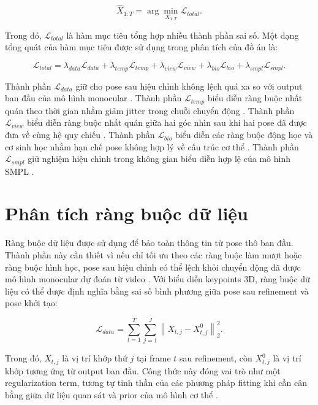 \documentclass[../DoAn.tex]{subfiles}
\begin{document}
\begin{equation}
\hat{X}_{1:T}
=
\arg\min_{X_{1:T}}
\mathcal{L}_{total}.
\end{equation}

Trong đó, $\mathcal{L}_{total}$ là hàm mục tiêu tổng hợp nhiều thành phần sai số. Một dạng tổng quát của hàm mục tiêu được sử dụng trong phân tích của đồ án là:

\begin{equation}
\mathcal{L}_{total}
=
\lambda_{data}\mathcal{L}_{data}
+
\lambda_{temp}\mathcal{L}_{temp}
+
\lambda_{view}\mathcal{L}_{view}
+
\lambda_{bio}\mathcal{L}_{bio}
+
\lambda_{smpl}\mathcal{L}_{smpl}.
\end{equation}

Thành phần $\mathcal{L}_{data}$ giữ cho pose sau hiệu chỉnh không lệch quá xa so với output ban đầu của mô hình monocular \cite{smplify2016}. Thành phần $\mathcal{L}_{temp}$ biểu diễn ràng buộc nhất quán theo thời gian nhằm giảm jitter trong chuỗi chuyển động \cite{physcap2020,shin2024wham}. Thành phần $\mathcal{L}_{view}$ biểu diễn ràng buộc nhất quán giữa hai góc nhìn sau khi hai pose đã được đưa về cùng hệ quy chiếu \cite{gu2024multiview,probtriangulation2023}. Thành phần $\mathcal{L}_{bio}$ biểu diễn các ràng buộc động học và cơ sinh học nhằm hạn chế pose không hợp lý về cấu trúc cơ thể \cite{physcap2020,delp2007opensim,uhlrich2023opencap}. Thành phần $\mathcal{L}_{smpl}$ giữ nghiệm hiệu chỉnh trong không gian biểu diễn hợp lệ của mô hình SMPL \cite{smpl2015,smplify2016}.

\section{Phân tích ràng buộc dữ liệu}

Ràng buộc dữ liệu được sử dụng để bảo toàn thông tin từ pose thô ban đầu. Thành phần này cần thiết vì nếu chỉ tối ưu theo các ràng buộc làm mượt hoặc ràng buộc hình học, pose sau hiệu chỉnh có thể lệch khỏi chuyển động đã được mô hình monocular dự đoán từ video \cite{smplify2016,shin2024wham}. Với biểu diễn keypoints 3D, ràng buộc dữ liệu có thể được định nghĩa bằng sai số bình phương giữa pose sau refinement và pose khởi tạo:

\begin{equation}
\mathcal{L}_{data}
=
\sum_{t=1}^{T}
\sum_{j=1}^{J}
\left\|
X_{t,j} - X^{0}_{t,j}
\right\|_2^2.
\end{equation}

Trong đó, $X_{t,j}$ là vị trí khớp thứ $j$ tại frame $t$ sau refinement, còn $X^{0}_{t,j}$ là vị trí khớp tương ứng từ output ban đầu. Công thức này đóng vai trò như một regularization term, tương tự tinh thần của các phương pháp fitting khi cần cân bằng giữa dữ liệu quan sát và prior của mô hình cơ thể \cite{smplify2016,smpl2015}.
\end{document}
